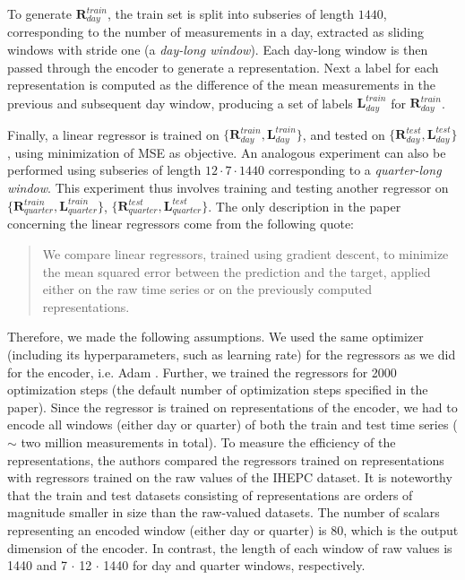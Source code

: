 To generate $\mathbf{R}_{day}^{train}$, the train set is split into subseries of length $1440$, corresponding to the number of measurements in a day, extracted as sliding windows with stride one (a \textit{day-long window}). Each day-long window is then passed through the encoder to generate a representation. Next a label for each representation is computed as the difference of the mean measurements in the previous and subsequent day window, producing a set of labels $\mathbf{L}_{day}^{train}$ for $\mathbf{R}_{day}^{train}$.


Finally, a linear regressor is trained on $\{\mathbf{R}_{day}^{train},\mathbf{L}_{day}^{train}\}$, and tested on $\{\mathbf{R}_{day}^{test},\mathbf{L}_{day}^{test}\}$, using minimization of MSE as objective. An analogous experiment can also be performed using subseries of length $12\cdot7\cdot1440$ corresponding to a \textit{quarter-long window}. This experiment thus involves training and testing another regressor on $\{\mathbf{R}_{quarter}^{train},\mathbf{L}_{quarter}^{train}\}$, $\{\mathbf{R}_{quarter}^{test},\mathbf{L}_{quarter}^{test}\}$.
The only description in the paper concerning the linear regressors come from the following quote:
\begin{quote}
We compare linear regressors, trained using gradient descent, to minimize the mean squared error between the prediction and the target, applied either on the raw time series or on the previously computed representations.
\end{quote}
Therefore, we made the following assumptions. We used the same optimizer (including its hyperparameters, such as learning rate) for the regressors as we did for the encoder, i.e. Adam \citep{kingma2014adam}. Further, we trained the regressors for 2000 optimization steps (the default number of optimization steps specified in the paper). Since the regressor is trained on representations of the encoder, we had to encode all windows (either day or quarter) of both the train and test time series ($\sim$ two million measurements in total). To measure the efficiency of the representations, the authors compared the regressors trained on representations with regressors trained on the raw values of the IHEPC dataset. It is noteworthy that the train and test datasets consisting of representations are orders of magnitude smaller in size than the raw-valued datasets. The number of scalars representing an encoded window (either day or quarter) is 80, which is the output dimension of the encoder. In contrast, the length of each window of raw values is 1440 and 7 $\cdot$ 12 $\cdot$ 1440 for day and quarter windows, respectively. 

